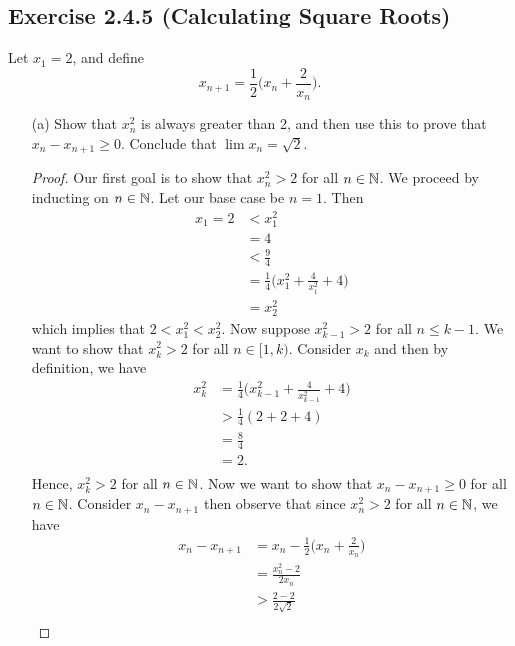 \subsection*{Exercise 2.4.5 (Calculating Square Roots)}
Let \(x_1 = 2\), and define 
\[
    x_{n+1} = \frac{1}{2} \Big( x_n + \frac{2}{x_n}\Big).
\]

\begin{enumerate}
    \item[(a)] Show that \( x_n^2\) is always greater than 2, and then use this to prove that \( x_n - x_{n+1} \geq 0\). Conclude that \( \lim x_n = \sqrt{2} \).
        \begin{proof}
         Our first goal is to show that \( x_n^2 > 2 \) for all \( n \in \mathbb{N} \). We proceed by inducting on \( n \in \mathbb{N}\). Let our base case be \( n = 1\). Then 
         \begin{align*}
         x_1 = 2 &< x_1^2   \\
                 &= 4 \\ 
                 &< \frac{9}{4} \\
                 &= \frac{1}{4} \Big( x_1^2 + \frac{4}{x_1^2} + 4 \Big) \\
                 &= x_2^2
         \end{align*}
         which implies that \( 2 < x_1^2 < x_2^2\). Now suppose \( x_{k-1}^2 > 2\) for all \( n \leq k - 1\). We want to show that \( x_k^2 > 2 \) for all \( n \in [1, k)\). Consider \( x_k \) and then by definition, we have 
         \begin{align*}
             x_{k}^2 &= \frac{1}{4} \Big( x_{k-1}^2 + \frac{4}{x_{k-1}^2} + 4 \Big) \\
                   &> \frac{1}{4} (2 + 2 + 4) \\ 
                   &= \frac{8}{4} \\
                   &= 2.\\
        \end{align*}
        Hence, \( x_k^2 > 2\) for all \( n \in \mathbb{N}\).  Now we want to show that \( x_n - x_{n+1} \geq 0  \) for all \( n \in \mathbb{N} \). Consider \( x_n - x_{n+1}\) then observe that since \( x_n^2 > 2 \) for all \( n \in \mathbb{N} \), we have 
        \begin{align*}
            x_n - x_{n+1}&= x_n - \frac{1}{2} \Big( x_n + \frac{2}{x_n}\Big) \\ 
                        &= \frac{x_n^2 - 2 }{2x_n} \\
                        &> \frac{2 - 2 }{2 \sqrt{2}} \\

\end{align*}
\end{proof}
\end{enumerate}

